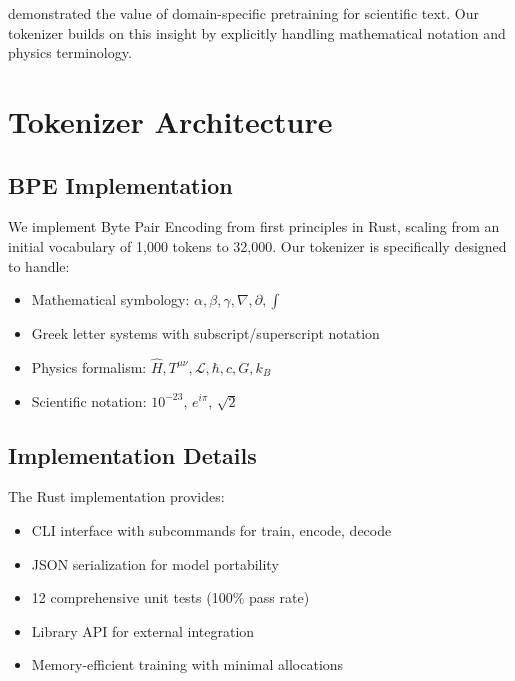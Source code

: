 \documentclass[11pt,a4paper,twocolumn]{article}
\theoremstyle{plain}
\theoremstyle{definition}
\begin{document}
\citet{wang2023scibert} demonstrated the value of domain-specific 
pretraining for scientific text. Our tokenizer builds on this 
insight by explicitly handling mathematical notation and physics 
terminology.

\section{Tokenizer Architecture}

\subsection{BPE Implementation}

We implement Byte Pair Encoding from first principles in Rust, 
scaling from an initial vocabulary of 1,000 tokens to 32,000. 
Our tokenizer is specifically designed to handle:

\begin{itemize}[leftmargin=*,itemsep=0pt]
    \item Mathematical symbology: $\alpha, \beta, \gamma, \nabla, \partial, \int$
    \item Greek letter systems with subscript/superscript notation
    \item Physics formalism: $\hat{H}, T^{\mu\nu}, \mathcal{L}, \hbar, c, G, k_B$
    \item Scientific notation: $10^{-23}$, $e^{i\pi}$, $\sqrt{2}$
\end{itemize}

\subsection{Implementation Details}

The Rust implementation provides:

\begin{itemize}[leftmargin=*,itemsep=0pt]
    \item CLI interface with subcommands for train, encode, decode
    \item JSON serialization for model portability
    \item 12 comprehensive unit tests (100\% pass rate)
    \item Library API for external integration
    \item Memory-efficient training with minimal allocations
\end{itemize}
\end{document}
